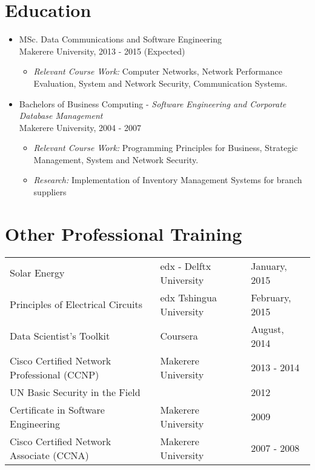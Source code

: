\documentclass[12pt,a4paper]{article}
\begin{document}
\section*{Education}

\begin{itemize}
  \item MSc. Data Communications and Software Engineering\\
    Makerere University, 2013 - 2015 (Expected)
    \begin{itemize}
    \item \emph{Relevant Course Work:} Computer Networks, Network Performance Evaluation, System and Network Security, Communication Systems.
    \end{itemize}
  \item Bachelors of Business Computing - \emph{Software Engineering and Corporate Database Management}\\ Makerere University, 2004 - 2007
    \begin{itemize}
    \item \emph{Relevant Course Work:} Programming Principles for Business, Strategic Management, System and Network Security.
    \item \emph{Research:} Implementation of Inventory Management Systems for branch suppliers
    \end{itemize}
\end{itemize}

\section*{Other Professional Training}
  \begin{tabular}{lll}
    Solar Energy & edx - Delftx University & January, 2015 \\
    Principles of Electrical Circuits & edx Tshingua University & February, 2015 \\
    Data Scientist's Toolkit & Coursera & August, 2014\\
    Cisco Certified Network Professional (CCNP) & Makerere University & 2013 - 2014 \\
    UN Basic Security in the Field & & 2012 \\
    Certificate in Software Engineering & Makerere University & 2009 \\
    Cisco Certified Network Associate (CCNA) & Makerere University & 2007 - 2008\\
  \end{tabular}
\end{document}
